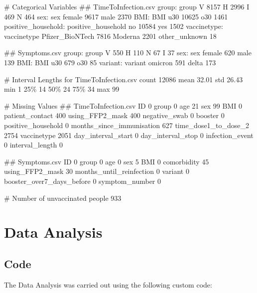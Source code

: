 \documentclass[11pt]{article}
\begin{document}
\begin{codeoutput}
\# Categorical Variables
\#\# TimeToInfection.csv
group:
group
V    8157
H    2996
I     469
N     464
sex:
sex
female    9617
male      2370
BMI:
BMI
u30    10625
o30     1461
positive\_household:
positive\_household
no     10584
yes     1502
vaccinetype:
vaccinetype
Pfizer\_BioNTech    7816
Moderna            2201
other\_unknown        18

\#\# Symptoms.csv
group:
group
V    550
H    110
N     67
I     37
sex:
sex
female    620
male      139
BMI:
BMI
u30    679
o30     85
variant:
variant
omicron    591
delta      173

\# Interval Lengths for TimeToInfection.csv
count   12086
mean    32.01
std     26.43
min         1
25\%        14
50\%        24
75\%        34
max        99

\# Missing Values
\#\# TimeToInfection.csv
ID                              0
group                           0
age                            21
sex                            99
BMI                             0
patient\_contact               400
using\_FFP2\_mask               400
negative\_swab                   0
booster                         0
positive\_household              0
months\_since\_immunisation     627
time\_dose1\_to\_dose\_2         2754
vaccinetype                  2051
day\_interval\_start              0
day\_interval\_stop               0
infection\_event                 0
interval\_length                 0

\#\# Symptoms.csv
ID                            0
group                         0
age                           0
sex                           5
BMI                           0
comorbidity                  45
using\_FFP2\_mask              30
months\_until\_reinfection      0
variant                       0
booster\_over7\_days\_before     0
symptom\_number                0

\# Number of unvaccinated people
933
\end{codeoutput}

\section{Data Analysis}
\subsection{{Code}}
The Data Analysis was carried out using the following custom code:
\end{document}
